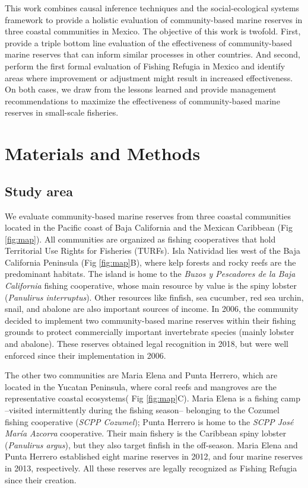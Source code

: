 \documentclass{frontiersSCNS}
\begin{document}
This work combines causal inference techniques and the social-ecological
systems framework to provide a holistic evaluation of community-based
marine reserves in three coastal communities in Mexico. The objective of
this work is twofold. First, provide a triple bottom line evaluation of
the effectiveness of community-based marine reserves that can inform
similar processes in other countries. And second, perform the first
formal evaluation of Fishing Refugia in Mexico and identify areas where
improvement or adjustment might result in increased effectiveness. On
both cases, we draw from the lessons learned and provide management
recommendations to maximize the effectiveness of community-based marine
reserves in small-scale fisheries.

\section{Materials and Methods}\label{materials-and-methods}

\subsection{Study area}\label{study-area}

We evaluate community-based marine reserves from three coastal
communities located in the Pacific coast of Baja California and the
Mexican Caribbean (Fig \ref{fig:map}). All communities are organized as
fishing cooperatives that hold Territorial Use Rights for Fisheries
(TURFs). Isla Natividad lies west of the Baja California Peninsula (Fig
\ref{fig:map}B), where kelp forests and rocky reefs are the predominant
habitats. The island is home to the \emph{Buzos y Pescadores de la Baja
California} fishing cooperative, whose main resource by value is the
spiny lobster (\emph{Panulirus interruptus}). Other resources like
finfish, sea cucumber, red sea urchin, snail, and abalone are also
important sources of income. In 2006, the community decided to implement
two community-based marine reserves within their fishing grounds to
protect commercially important invertebrate species (mainly lobster and
abalone). These reserves obtained legal recognition in 2018, but were
well enforced since their implementation in 2006.

The other two communities are Maria Elena and Punta Herrero, which are
located in the Yucatan Peninsula, where coral reefs and mangroves are
the representative coastal ecosystems( Fig \ref{fig:map}C). Maria Elena
is a fishing camp --visited intermittently during the fishing season--
belonging to the Cozumel fishing cooperative (\emph{SCPP Cozumel});
Punta Herrero is home to the \emph{SCPP José María Azcorra} cooperative.
Their main fishery is the Caribbean spiny lobster (\emph{Panulirus
argus}), but they also target finfish in the off-season. Maria Elena and
Punta Herrero established eight marine reserves in 2012, and four marine
reserves in 2013, respectively. All these reserves are legally
recognized as Fishing Refugia since their creation.
\end{document}
